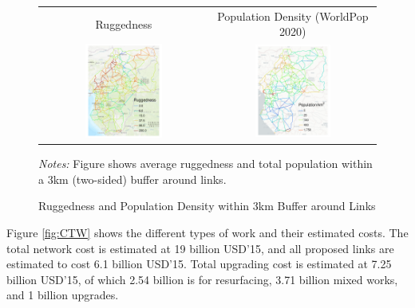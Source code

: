 \documentclass[a4paper]{article}
\begin{document}
\begin{figure}[H] \vspace{-1mm}
\centering
\caption{\label{fig:RUGG_POP} Ruggedness and Population Density within 3km Buffer around Links}
\vspace{2mm}
\begin{tabular}{cc}
Ruggedness \citep{nunn2012ruggedness} & Population Density (WorldPop 2020) \\
\includegraphics[width=0.48\textwidth]{"../figures/trans_CEMAC_network_rugg.pdf"} &
\includegraphics[width=0.48\textwidth]{"../figures/trans_CEMAC_network_pop_wpop_km2.pdf"} \\ [-0.2em]
\end{tabular}
\scriptsize 
\emph{Notes:} Figure shows average ruggedness and total population within a 3km (two-sided) buffer around links.
\end{figure}

Figure \ref{fig:CTW} shows the different types of work and their estimated costs. The total network cost is estimated at 19 billion USD'15, and all proposed links are estimated to cost 6.1 billion USD'15. Total upgrading cost is estimated at 7.25 billion USD'15, of which 2.54 billion is for resurfacing, 3.71 billion mixed works, and 1 billion upgrades. 
\end{document}
